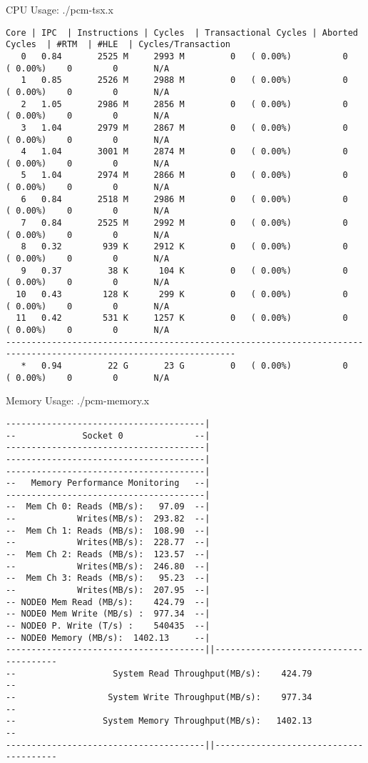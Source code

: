CPU Usage: ./pcm-tsx.x
\begin{lstlisting}
Core | IPC  | Instructions | Cycles  | Transactional Cycles | Aborted Cycles  | #RTM  | #HLE  | Cycles/Transaction 
   0   0.84       2525 M     2993 M         0   ( 0.00%)          0   ( 0.00%)    0        0       N/A
   1   0.85       2526 M     2988 M         0   ( 0.00%)          0   ( 0.00%)    0        0       N/A
   2   1.05       2986 M     2856 M         0   ( 0.00%)          0   ( 0.00%)    0        0       N/A
   3   1.04       2979 M     2867 M         0   ( 0.00%)          0   ( 0.00%)    0        0       N/A
   4   1.04       3001 M     2874 M         0   ( 0.00%)          0   ( 0.00%)    0        0       N/A
   5   1.04       2974 M     2866 M         0   ( 0.00%)          0   ( 0.00%)    0        0       N/A
   6   0.84       2518 M     2986 M         0   ( 0.00%)          0   ( 0.00%)    0        0       N/A
   7   0.84       2525 M     2992 M         0   ( 0.00%)          0   ( 0.00%)    0        0       N/A
   8   0.32        939 K     2912 K         0   ( 0.00%)          0   ( 0.00%)    0        0       N/A
   9   0.37         38 K      104 K         0   ( 0.00%)          0   ( 0.00%)    0        0       N/A
  10   0.43        128 K      299 K         0   ( 0.00%)          0   ( 0.00%)    0        0       N/A
  11   0.42        531 K     1257 K         0   ( 0.00%)          0   ( 0.00%)    0        0       N/A
-------------------------------------------------------------------------------------------------------------------
   *   0.94         22 G       23 G         0   ( 0.00%)          0   ( 0.00%)    0        0       N/A
\end{lstlisting}


Memory Usage: ./pcm-memory.x
\begin{lstlisting}
---------------------------------------|
--             Socket 0              --|
---------------------------------------|
---------------------------------------|
---------------------------------------|
--   Memory Performance Monitoring   --|
---------------------------------------|
--  Mem Ch 0: Reads (MB/s):   97.09  --|
--            Writes(MB/s):  293.82  --|
--  Mem Ch 1: Reads (MB/s):  108.90  --|
--            Writes(MB/s):  228.77  --|
--  Mem Ch 2: Reads (MB/s):  123.57  --|
--            Writes(MB/s):  246.80  --|
--  Mem Ch 3: Reads (MB/s):   95.23  --|
--            Writes(MB/s):  207.95  --|
-- NODE0 Mem Read (MB/s):    424.79  --|
-- NODE0 Mem Write (MB/s) :  977.34  --|
-- NODE0 P. Write (T/s) :    540435  --|
-- NODE0 Memory (MB/s):  1402.13     --|
---------------------------------------||---------------------------------------
--                   System Read Throughput(MB/s):    424.79                  --
--                  System Write Throughput(MB/s):    977.34                  --
--                 System Memory Throughput(MB/s):   1402.13                  --
---------------------------------------||---------------------------------------
\end{lstlisting}

